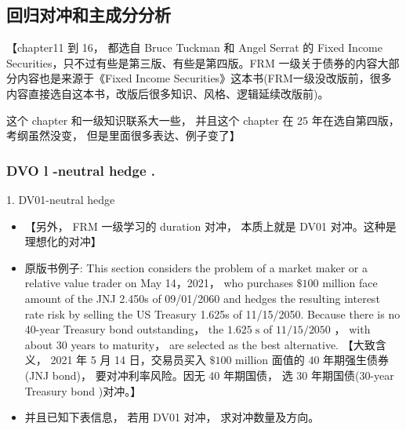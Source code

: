 


\subsection{回归对冲和主成分分析}

【chapter11 到 16， 都选自 Bruce Tuckman 和 Angel Serrat 的 Fixed Income Securities，只不过有些是第三版、有些是第四版。FRM 一级关于债券的内容大部分内容也是来源于《Fixed Income Securities》这本书(FRM一级没改版前，很多内容直接选自这本书，改版后很多知识、风格、逻辑延续改版前)。

这个 chapter 和一级知识联系大一些， 并且这个 chapter 在 25 年在选自第四版， 考纲虽然没变， 但是里面很多表达、例子变了】




\subsubsection{DVO l -neutral hedge . }
1. DV01-neutral hedge

\begin{itemize}
\item 【另外， FRM 一级学习的 duration 对冲， 本质上就是 DV01 对冲。这种是理想化的对冲】
\end{itemize}

\begin{itemize}
\item 原版书例子: This section considers the problem of a market maker or a relative value trader on May 14，2021， who purchases \(\$ {100}\) million face amount of the JNJ 2.450s of 09/01/2060 and hedges the resulting interest rate risk by selling the US Treasury 1.625s of 11/15/2050. Because there is no 40-year Treasury bond outstanding， the \({1.625}\mathrm{\;s}\) of \({11}/{15}/{2050}\) ， with about 30 years to maturity， are selected as the best alternative. 【大致含义， 2021 年 5 月 14 日，交易员买入 \(\$ {100}\) million 面值的 40 年期强生债券 (JNJ bond)， 要对冲利率风险。因无 40 年期国债， 选 30 年期国债(30-year Treasury bond )对冲。】
\end{itemize}

\begin{itemize}
\item 并且已知下表信息， 若用 DV01 对冲， 求对冲数量及方向。
\end{itemize}

\begin{center}
\end{center}

